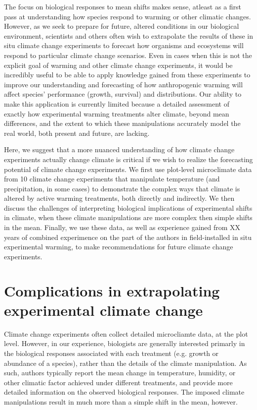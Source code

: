 \documentclass{article}
\begin{document}
\par The focus on biological responses to mean shifts makes sense, atleast as a first pass at understanding how species respond to warming or other climatic changes. However, as we seek to prepare for future, altered conditions in our biological environment, scientists and others often wish to extrapolate the results of these in situ climate change experiments to forecast how organisms and ecosystems will respond to particular climate change scenarios. Even in cases when this is not the explicit goal of warming and other climate change experiments, it would be incredibly useful to be able to apply knowledge gained from these experiments to improve our understanding and forecasting of how anthropogenic warming will affect species' performance (growth, survival) and distributions. Our ability to make this application is currently limited because a detailed assessment of exactly how experimental warming treatments alter climate, beyond mean differences, and the extent to which these manipulations accurately model the real world, both present and future, are lacking.
\par Here, we suggest that a more nuanced understanding of how climate change experiments actually change climate is critical if we wish to realize the forecasting potential of climate change experiments. We first use plot-level microclimate data from 10 climate change experiments that manipulate temperature (and precipitation, in some cases) to demonstrate the complex ways that climate is altered by active warming treatments, both directly and indirectly. We then discuss the challenges of interpreting biological implications of experimental shifts in climate, when these climate manipulations are more complex then simple shifts in the mean. Finally, we use these data, as well as experience gained from XX years of combined experimence on the part of the authors in field-installed in situ experimental warming, to make recommendations for future climate change experiments.
 
\section {Complications in extrapolating experimental climate change}
Climate change experiments often collect detailed microcliamte data, at the plot level. However, in our experience, biologists are generally interested primarly in the biological responses associated with each treatment (e.g. growth or abundance of a species), rather than the details of the climate manipulation. As such, authors typically report the mean change in temperature, humidity, or other climatic factor achieved under different treatments, and provide more detailed information on the observed biological responses. The imposed climate manipulations result in much more than a simple shift in the mean, however.
\end{document}
